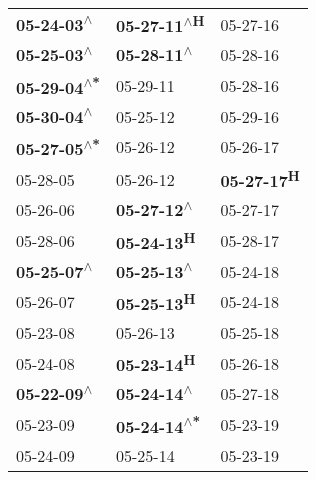 \begin{supertabular}{lll}
  \textbf{05-24-03\textsuperscript{$\wedge$}} &  \textbf{05-27-11\textsuperscript{$\wedge$H}} &            05-27-16\textsuperscript{} \\
  \textbf{05-25-03\textsuperscript{$\wedge$}} &   \textbf{05-28-11\textsuperscript{$\wedge$}} &            05-28-16\textsuperscript{} \\
 \textbf{05-29-04\textsuperscript{$\wedge$*}} &                    05-29-11\textsuperscript{} &            05-28-16\textsuperscript{} \\
  \textbf{05-30-04\textsuperscript{$\wedge$}} &                    05-25-12\textsuperscript{} &            05-29-16\textsuperscript{} \\
 \textbf{05-27-05\textsuperscript{$\wedge$*}} &                    05-26-12\textsuperscript{} &            05-26-17\textsuperscript{} \\
                   05-28-05\textsuperscript{} &                    05-26-12\textsuperscript{} &  \textbf{05-27-17\textsuperscript{H}} \\
                   05-26-06\textsuperscript{} &   \textbf{05-27-12\textsuperscript{$\wedge$}} &            05-27-17\textsuperscript{} \\
                   05-28-06\textsuperscript{} &          \textbf{05-24-13\textsuperscript{H}} &            05-28-17\textsuperscript{} \\
  \textbf{05-25-07\textsuperscript{$\wedge$}} &   \textbf{05-25-13\textsuperscript{$\wedge$}} &            05-24-18\textsuperscript{} \\
                   05-26-07\textsuperscript{} &          \textbf{05-25-13\textsuperscript{H}} &            05-24-18\textsuperscript{} \\
                   05-23-08\textsuperscript{} &                    05-26-13\textsuperscript{} &            05-25-18\textsuperscript{} \\
                   05-24-08\textsuperscript{} &          \textbf{05-23-14\textsuperscript{H}} &            05-26-18\textsuperscript{} \\
  \textbf{05-22-09\textsuperscript{$\wedge$}} &   \textbf{05-24-14\textsuperscript{$\wedge$}} &            05-27-18\textsuperscript{} \\
                   05-23-09\textsuperscript{} &  \textbf{05-24-14\textsuperscript{$\wedge$*}} &            05-23-19\textsuperscript{} \\
                   05-24-09\textsuperscript{} &                    05-25-14\textsuperscript{} &            05-23-19\textsuperscript{} \\

\end{supertabular}
